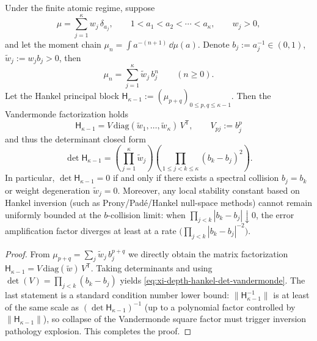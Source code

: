 \begin{proposition}\label{prop:xi-depth-hankel-determinant-vandermonde-square}
Under the finite atomic regime, suppose
\[
\mu=\sum_{j=1}^{\kappa}w_j\,\delta_{a_j},
\qquad
1<a_1<a_2<\cdots<a_\kappa,\qquad w_j>0,
\]
and let the moment chain \(\mu_n=\int a^{-(n+1)}\,\dd\mu(a)\).
Denote \(b_j:=a_j^{-1}\in(0,1)\), \(\widetilde w_j:=w_j b_j>0\), then
\[
\mu_n=\sum_{j=1}^{\kappa}\widetilde w_j\,b_j^{n}\qquad(n\ge 0).
\]
Let the Hankel principal block \(\mathsf H_{\kappa-1}:=(\mu_{p+q})_{0\le p,q\le \kappa-1}\).
Then the Vandermonde factorization holds
\[
\boxed{\;
\mathsf H_{\kappa-1}=V\,\mathrm{diag}(\widetilde w_1,\dots,\widetilde w_\kappa)\,V^{\mathsf T},\qquad
V_{pj}:=b_j^{p}\;}
\]
and thus the determinant closed form
\begin{equation}\label{eq:xi-depth-hankel-det-vandermonde}
\boxed{\;
\det \mathsf H_{\kappa-1}
=\left(\prod_{j=1}^{\kappa}\widetilde w_j\right)
\left(\prod_{1\le j<k\le \kappa}(b_k-b_j)^2\right).\;}
\end{equation}
In particular, \(\det \mathsf H_{\kappa-1}=0\) if and only if there exists a spectral collision \(b_j=b_k\) or weight degeneration \(\widetilde w_j=0\).
Moreover, any local stability constant based on Hankel inversion (such as Prony/Pad\'e/Hankel null-space methods) cannot remain uniformly bounded at the \(b\)-collision limit: when \(\prod_{j<k}|b_k-b_j|\downarrow 0\), the error amplification factor diverges at least at a rate \(\bigl(\prod_{j<k}|b_k-b_j|^{-2}\bigr)\).
\end{proposition}

\begin{proof}
From
\(
\mu_{p+q}=\sum_j \widetilde w_j\,b_j^{p+q}
\)
we directly obtain the matrix factorization \(\mathsf H_{\kappa-1}=V\,\mathrm{diag}(\widetilde w)\,V^{\mathsf T}\).
Taking determinants and using \(\det(V)=\prod_{j<k}(b_k-b_j)\) yields \eqref{eq:xi-depth-hankel-det-vandermonde}.
The last statement is a standard condition number lower bound: \(\|\mathsf H_{\kappa-1}^{-1}\|\) is at least of the same scale as \((\det\mathsf H_{\kappa-1})^{-1}\) (up to a polynomial factor controlled by \(\|\mathsf H_{\kappa-1}\|\)), so collapse of the Vandermonde square factor must trigger inversion pathology explosion. This completes the proof.
\end{proof}

